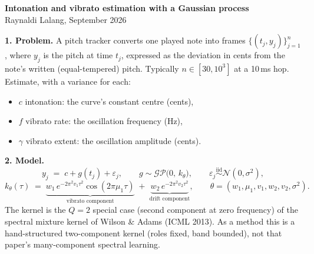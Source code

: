 \documentclass[10pt,a4paper]{article}
\newcommand{\N}{\mathcal{N}}
\newcommand{\GP}{\mathcal{GP}}
\begin{document}
\begin{center}
{\large\bfseries Intonation and vibrato estimation with a Gaussian process}\\[2pt]
{\small Raynaldi Lalang, September 2026}
\end{center}

\begin{center}
\end{center}

\textbf{1. Problem.}
A pitch tracker converts one played note into frames
$\{(t_j, y_j)\}_{j=1}^{n}$, where $y_j$ is the pitch at time $t_j$,
expressed as the deviation in cents from the note's written
(equal-tempered) pitch. Typically $n \in [30, 10^3]$ at a 10\,ms hop.
Estimate, with a variance for each:
\begin{itemize}[nosep,leftmargin=2em]
  \item[] $c$ \quad intonation: the curve's constant centre (cents),
  \item[] $f$ \quad vibrato rate: the oscillation frequency (Hz),
  \item[] $\gamma$ \quad vibrato extent: the oscillation amplitude (cents).
\end{itemize}

\textbf{2. Model.}
\begin{equation}
y_j \;=\; c + g(t_j) + \varepsilon_j, \qquad
g \sim \GP\bigl(0,\, k_\theta\bigr), \qquad
\varepsilon_j \overset{\text{iid}}{\sim} \N(0, \sigma^2),
\label{eq:model}
\end{equation}
\begin{equation}
k_\theta(\tau) \;=\;
\underbrace{w_1\, e^{-2\pi^2 v_1 \tau^2} \cos(2\pi \mu_1 \tau)}_{\text{vibrato component}}
\;+\;
\underbrace{w_2\, e^{-2\pi^2 v_2 \tau^2}}_{\text{drift component}},
\qquad \theta = (w_1, \mu_1, v_1, w_2, v_2, \sigma^2).
\label{eq:kernel}
\end{equation}
The kernel is the $Q = 2$ special case (second component at zero
frequency) of the spectral mixture kernel of Wilson \& Adams (ICML
2013). As a method this is a hand-structured two-component kernel
(roles fixed, band bounded), not that paper's many-component spectral
learning.
\end{document}
